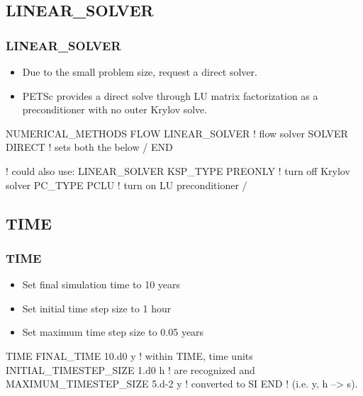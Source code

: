\documentclass{beamer}
\newcommand\redcomment[1]{{{\color{red} #1}}}
\newcommand\bluecomment[1]{{{\color{blue} #1}}}
\newcommand\greencomment[1]{{{\color{green} #1}}}
\begin{document}
\subsection{LINEAR\_SOLVER}

\begin{frame}[fragile]\frametitle{LINEAR\_SOLVER}

\begin{itemize}
\item Due to the small problem size, request a direct solver.
\item PETSc provides a direct solve through LU matrix factorization as a preconditioner with no outer Krylov solve.
\end{itemize}

\begin{semiverbatim}

NUMERICAL_METHODS FLOW
  LINEAR_SOLVER        \bluecomment{! flow solver}
    SOLVER DIRECT      \bluecomment{! sets both the below}
  /
END

  \bluecomment{! could also use:}
  LINEAR_SOLVER
    KSP_TYPE PREONLY   \bluecomment{! turn off Krylov solver}
    PC_TYPE PCLU       \bluecomment{! turn on LU preconditioner}
  /

\end{semiverbatim}

\end{frame}

\subsection{TIME}

\begin{frame}[fragile]\frametitle{TIME}

\begin{itemize}
\item Set final simulation time to 10 years
\item Set initial time step size to 1 hour
\item Set maximum time step size to 0.05 years
\end{itemize}


\begin{semiverbatim}

TIME
  FINAL_TIME 10.d0 \redcomment{y}            \bluecomment{! within TIME, time units}
  INITIAL_TIMESTEP_SIZE 1.d0 \redcomment{h}  \bluecomment{!   are recognized and}
  MAXIMUM_TIMESTEP_SIZE 5.d-2 \redcomment{y} \bluecomment{!   converted to SI}
END                             \bluecomment{! (i.e. \redcomment{y}, \redcomment{h} --> \greencomment{s}).}
\end{semiverbatim}

\end{frame}
\end{document}
